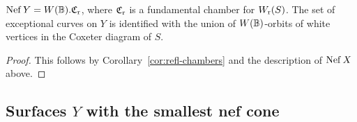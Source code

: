 \documentclass{amsart}
\begin{document}
\begin{lemma}\label{lem:nef-Y}
  $\operatorname{Nef} Y=W({\mathbb B}).{\mathfrak C}_{\rm r}$, where ${\mathfrak C}_{\rm r}$ is a fundamental chamber
  for $W_{\rm r}(S)$.
  The set of exceptional curves on $Y$ is identified with
  the union of $W({\mathbb B})$-orbits
  of white vertices in the Coxeter diagram of $S$.
\end{lemma}
\begin{proof}
  This follows by Corollary~\ref{cor:refl-chambers}
  and the description of $\operatorname{Nef} X$ above.   
\end{proof}

\subsection{Surfaces $Y$ with the smallest nef cone}
\label{sec:smallest-nef}
\end{document}
